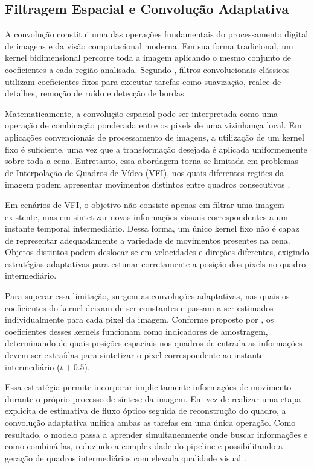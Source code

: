 \documentclass[
    12pt,                %
    openright,           %
    oneside,             %
    a4paper,             %
    english,             %
    brazil               %
]{abntex2}
\begin{document}
\subsection{Filtragem Espacial e Convolução Adaptativa}

A convolução constitui uma das operações fundamentais do processamento digital de imagens e da visão computacional moderna. Em sua forma tradicional, um kernel bidimensional percorre toda a imagem aplicando o mesmo conjunto de coeficientes a cada região analisada. Segundo , filtros convolucionais clássicos utilizam coeficientes fixos para executar tarefas como suavização, realce de detalhes, remoção de ruído e detecção de bordas.

Matematicamente, a convolução espacial pode ser interpretada como uma operação de combinação ponderada entre os pixels de uma vizinhança local. Em aplicações convencionais de processamento de imagens, a utilização de um kernel fixo é suficiente, uma vez que a transformação desejada é aplicada uniformemente sobre toda a cena. Entretanto, essa abordagem torna-se limitada em problemas de Interpolação de Quadros de Vídeo (VFI), nos quais diferentes regiões da imagem podem apresentar movimentos distintos entre quadros consecutivos \cite{Szeliski2022}.

Em cenários de VFI, o objetivo não consiste apenas em filtrar uma imagem existente, mas em sintetizar novas informações visuais correspondentes a um instante temporal intermediário. Dessa forma, um único kernel fixo não é capaz de representar adequadamente a variedade de movimentos presentes na cena. Objetos distintos podem deslocar-se em velocidades e direções diferentes, exigindo estratégias adaptativas para estimar corretamente a posição dos pixels no quadro intermediário.

Para superar essa limitação, surgem as convoluções adaptativas, nas quais os coeficientes do kernel deixam de ser constantes e passam a ser estimados individualmente para cada pixel da imagem. Conforme proposto por , os coeficientes desses kernels funcionam como indicadores de amostragem, determinando de quais posições espaciais nos quadros de entrada as informações devem ser extraídas para sintetizar o pixel correspondente ao instante intermediário ($t+0.5$).

Essa estratégia permite incorporar implicitamente informações de movimento durante o próprio processo de síntese da imagem. Em vez de realizar uma etapa explícita de estimativa de fluxo óptico seguida de reconstrução do quadro, a convolução adaptativa unifica ambas as tarefas em uma única operação. Como resultado, o modelo passa a aprender simultaneamente onde buscar informações e como combiná-las, reduzindo a complexidade do pipeline e possibilitando a geração de quadros intermediários com elevada qualidade visual \cite{Niklaus2021}.
\end{document}
